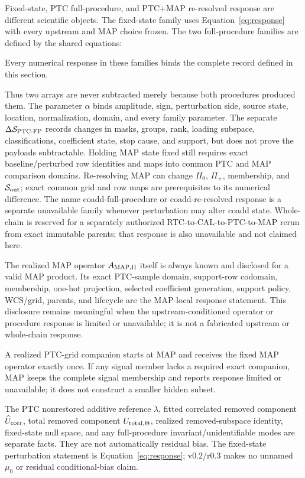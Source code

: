 \documentclass[10pt]{article}
\begin{document}
Fixed-state, PTC full-procedure, and PTC+MAP re-resolved response are different
scientific objects. The fixed-state family uses Equation~\eqref{eq:response}
with every upstream and MAP choice frozen. The two full-procedure families are
defined by the shared equations:

\SCIMapProcedureResponseEquations

\SCIMapComparisonSpaceDefinition

Every numerical response in these families binds the complete
\SCIMapComparisonSpaceRecordId{} record defined in this section.

Thus two arrays are never subtracted merely because both procedures produced
them. The parameter \(\alpha\) binds amplitude, sign, perturbation side,
source state, location, normalization, domain, and every family parameter.
The separate \(\Delta\mathcal S_{{\rm PTC}\text{-}{\rm FP}}\) records changes
in masks, groups, rank, loading subspace, classifications, coefficient state,
stop cause, and support, but does not prove the payloads subtractable. Holding
MAP state fixed still requires exact baseline/perturbed row identities and
maps into common PTC and MAP comparison domains. Re-resolving MAP can change
\(\Pi_0\), \(\Pi_+\), membership, and \(\mathcal S_{\rm out}\); exact common
grid and row maps are prerequisites to its numerical difference. The name
coadd-full-procedure or coadd-re-resolved response is a separate unavailable
family whenever perturbation may alter coadd state. Whole-chain is reserved
for a separately authorized RTC-to-CAL-to-PTC-to-MAP rerun from exact immutable
parents; that response is also unavailable and not claimed here.

The realized MAP operator \(A_{{\rm MAP},\Pi}\) itself is always known and
disclosed for a valid MAP product. Its exact PTC-sample domain, support-row
codomain, membership, one-hot projection, selected coefficient generation,
support policy, WCS/grid, parents, and lifecycle are the MAP-local response
statement. This disclosure remains meaningful when the upstream-conditioned
operator or procedure response is limited or unavailable; it is not a
fabricated upstream or whole-chain response.

A realized PTC-grid companion starts at MAP and receives the fixed MAP
operator exactly once. If any signal member lacks a required exact companion,
MAP keeps the complete signal membership and reports response limited or
unavailable; it does not construct a smaller hidden subset.

The PTC nonrestored additive reference \(\lambda\), fitted correlated removed
component \(\widehat U_{\rm corr}\), total removed component
\(U_{{\rm total},\Theta}\), realized removed-subspace identity, fixed-state
null space, and any full-procedure invariant/unidentifiable modes are separate
facts. They are not automatically residual bias. The fixed-state perturbation
statement is Equation~\eqref{eq:response}; v0.2/r0.3 makes no unnamed \(\mu_0\) or
residual conditional-bias claim.
\end{document}
